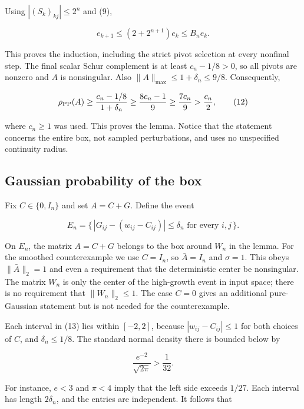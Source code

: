 \documentclass[10pt,a4paper]{article}
\begin{document}
Using \(|(S_k)_{kj}|\leq2^n\) and (9),

\nopagebreak[4]

\[
e_{k+1}\leq (2+2^{n+1})e_k\leq B_ne_k.
\tag{11}
\]

This proves the induction, including the strict pivot selection at every
nonfinal step. The final scalar Schur complement is at least
\(c_n-1/8>0\), so all pivots are nonzero and \(A\) is nonsingular. Also
\(\|A\|_{\max}\leq1+\delta_n\leq9/8\). Consequently,

\nopagebreak[4]

\[
\rho_{\rm PP}(A)\geq\frac{c_n-1/8}{1+\delta_n}
\geq\frac{8c_n-1}{9}\geq\frac{7c_n}{9}>\frac{c_n}{2},
\tag{12}
\]

where \(c_n\geq1\) was used. This proves the lemma. Notice that the
statement concerns the entire box, not sampled perturbations, and uses
no unspecified continuity radius.


\subsection{Gaussian probability of the
box}\label{gaussian-probability-of-the-box}

Fix \(C\in\{0,I_n\}\) and set \(A=C+G\). Define the event

\nopagebreak[4]

\[
E_n=\{\,|G_{ij}-(w_{ij}-C_{ij})|\leq\delta_n
\text{ for every }i,j\,\}.
\tag{13}
\]

On \(E_n\), the matrix \(A=C+G\) belongs to the box around \(W_n\) in
the lemma. For the smoothed counterexample we use \(C=I_n\), so
\(\bar A=I_n\) and \(\sigma=1\). This obeys \(\|\bar A\|_2=1\) and even
a requirement that the deterministic center be nonsingular. The matrix
\(W_n\) is only the center of the high-growth event in input space;
there is no requirement that \(\|W_n\|_2\leq1\). The case \(C=0\) gives
an additional pure-Gaussian statement but is not needed for the
counterexample.

Each interval in (13) lies within \([-2,2]\), because
\(|w_{ij}-C_{ij}|\leq1\) for both choices of \(C\), and
\(\delta_n\leq1/8\). The standard normal density there is bounded below
by

\nopagebreak[4]

\[
\frac{e^{-2}}{\sqrt{2\pi}}>\frac1{32}.
\tag{14}
\]

For instance, \(e<3\) and \(\pi<4\) imply that the left side exceeds
\(1/27\). Each interval has length \(2\delta_n\), and the entries are
independent. It follows that
\end{document}
